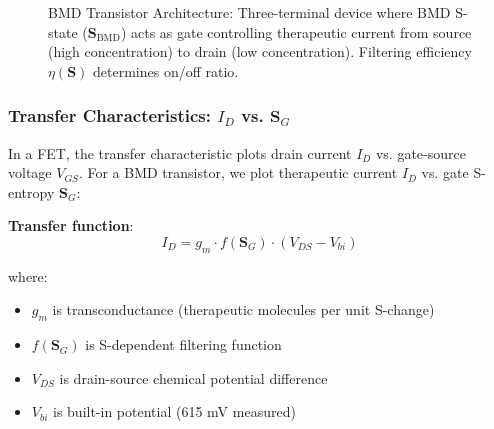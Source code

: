 \documentclass[11pt,a4paper]{article}
\begin{document}
\begin{figure}[H]
\centering
{}
\caption{BMD Transistor Architecture: Three-terminal device where BMD S-state ($\mathbf{S}_{\text{BMD}}$) acts as gate controlling therapeutic current from source (high concentration) to drain (low concentration). Filtering efficiency $\eta(\mathbf{S})$ determines on/off ratio.}
\label{fig:bmd_transistor}
\end{figure}

\subsubsection{Transfer Characteristics: $I_D$ vs. $\mathbf{S}_G$}

In a FET, the transfer characteristic plots drain current $I_D$ vs. gate-source voltage $V_{GS}$. For a BMD transistor, we plot therapeutic current $I_D$ vs. gate S-entropy $\mathbf{S}_G$:

\textbf{Transfer function}:
\begin{equation}
I_D = g_m \cdot f(\mathbf{S}_G) \cdot (V_{DS} - V_{bi})
\end{equation}

where:
\begin{itemize}
\item $g_m$ is transconductance (therapeutic molecules per unit S-change)
\item $f(\mathbf{S}_G)$ is S-dependent filtering function
\item $V_{DS}$ is drain-source chemical potential difference
\item $V_{bi}$ is built-in potential (615 mV measured)
\end{itemize}
\end{document}
